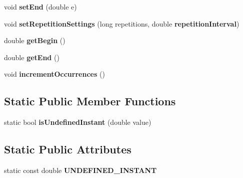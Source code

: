 \begin{CompactItemize}
\item 
void \textbf{setEnd} (double e)\label{classbr_1_1pucrio_1_1telemidia_1_1ginga_1_1ncl_1_1model_1_1event_1_1PresentationEvent_351990ea9254cb416abd71004f39470d}

\item 
void \textbf{setRepetitionSettings} (long repetitions, double {\bf repetitionInterval})\label{classbr_1_1pucrio_1_1telemidia_1_1ginga_1_1ncl_1_1model_1_1event_1_1PresentationEvent_02220b3870a4691bc2428cab122b23df}

\item 
double \textbf{getBegin} ()\label{classbr_1_1pucrio_1_1telemidia_1_1ginga_1_1ncl_1_1model_1_1event_1_1PresentationEvent_4a0dfb47c743a26a39e49696c0e5e1fe}

\item 
double \textbf{getEnd} ()\label{classbr_1_1pucrio_1_1telemidia_1_1ginga_1_1ncl_1_1model_1_1event_1_1PresentationEvent_9601985844def39b11f5b2499802e912}

\item 
void \textbf{incrementOccurrences} ()\label{classbr_1_1pucrio_1_1telemidia_1_1ginga_1_1ncl_1_1model_1_1event_1_1PresentationEvent_e517c2eaa88c947a2df8ef7376b4f63c}

\end{CompactItemize}
\subsection*{Static Public Member Functions}
\begin{CompactItemize}
\item 
static bool \textbf{isUndefinedInstant} (double value)\label{classbr_1_1pucrio_1_1telemidia_1_1ginga_1_1ncl_1_1model_1_1event_1_1PresentationEvent_c3d5bcb61a09025c32d742cc3c5c7053}

\end{CompactItemize}
\subsection*{Static Public Attributes}
\begin{CompactItemize}
\item 
static const double {\bf UNDEFINED\_\-INSTANT}\label{classbr_1_1pucrio_1_1telemidia_1_1ginga_1_1ncl_1_1model_1_1event_1_1PresentationEvent_2befe4ce992e2353f387bfb141003f94}

\end{CompactItemize}
